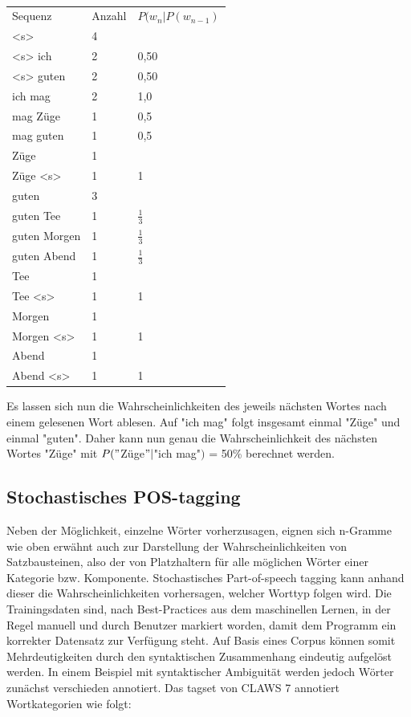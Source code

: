 \documentclass[12pt]{report}
\begin{document}
\tt
\begin{tabular}{lll}
Sequenz & Anzahl & $P(w_{n}|P(w_{n-1})$ \\
<s> & 4 & \\
<s> ich & 2 & 0,50 \\
<s> guten & 2 & 0,50 \\ 
ich mag & 2 & 1,0 \\ 
mag Züge & 1 & 0,5 \\
mag guten & 1 & 0,5 \\
Züge & 1 & \\
Züge <s> & 1 & 1 \\
guten & 3 & \\
guten Tee & 1 & $\frac{1}{3}$ \\
guten Morgen & 1 & $\frac{1}{3}$ \\
guten Abend & 1 & $\frac{1}{3}$ \\
Tee & 1 & \\
Tee <s> & 1 & 1 \\
Morgen & 1 & \\
Morgen <s> & 1 & 1 \\
Abend & 1 & \\
Abend <s> & 1 & 1\\
\end{tabular}
\rm
Es lassen sich nun die Wahrscheinlichkeiten des jeweils nächsten Wortes nach einem gelesenen Wort ablesen. Auf "ich mag" folgt insgesamt einmal "Züge" und einmal "guten". Daher kann nun genau die Wahrscheinlichkeit des nächsten Wortes "Züge" mit $P("$Züge$"|$"ich mag"$)$ = 50\% berechnet werden.

\subsection{Stochastisches POS-tagging}
Neben der Möglichkeit, einzelne Wörter vorherzusagen, eignen sich n-Gramme wie oben erwähnt auch zur Darstellung der Wahrscheinlichkeiten von Satzbausteinen, also der von Platzhaltern für alle möglichen Wörter einer Kategorie bzw. Komponente. Stochastisches Part-of-speech tagging kann anhand dieser die Wahrscheinlichkeiten vorhersagen, welcher Worttyp folgen wird. Die Trainingsdaten sind, nach Best-Practices aus dem maschinellen Lernen, in der Regel manuell und durch Benutzer markiert worden, damit dem Programm ein korrekter Datensatz zur Verfügung steht. Auf Basis eines Corpus können somit Mehrdeutigkeiten durch den syntaktischen Zusammenhang eindeutig aufgelöst werden. In einem Beispiel mit syntaktischer Ambiguität werden jedoch Wörter zunächst verschieden annotiert.
Das tagset von CLAWS 7 annotiert Wortkategorien wie folgt:
\end{document}
